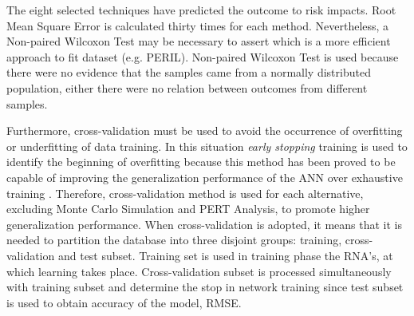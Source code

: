 The eight selected techniques have predicted the outcome to risk impacts. Root Mean Square Error is calculated thirty times for each method. Nevertheless, a Non-paired Wilcoxon Test \cite{siegel1956nonparametric} may be necessary to assert which is a more efficient approach to fit dataset (e.g. PERIL). Non-paired Wilcoxon Test is used because there were no evidence that the samples came from a normally distributed population, either there were no relation between outcomes from different samples.

Furthermore, cross-validation \cite{amari1996statistical} must be used to avoid the occurrence of overfitting or underfitting of data training. In this situation \textit{early stopping} training is used to identify the beginning of overfitting because this method has been proved to be capable of improving the generalization performance of the ANN over exhaustive training \cite{haykin1994neural} \cite{engelbrecht2007computational} \cite{amari1996new}. Therefore, cross-validation method is used for each alternative, excluding Monte Carlo Simulation and PERT Analysis, to promote higher generalization performance. When cross-validation is adopted, it means that it is needed to partition the database into three disjoint groups: training, cross-validation and test subset. Training set is used in training phase the RNA's, at which learning takes place. Cross-validation subset is processed simultaneously with training subset and determine the stop in network training since test subset is used to obtain accuracy of the model, RMSE.

